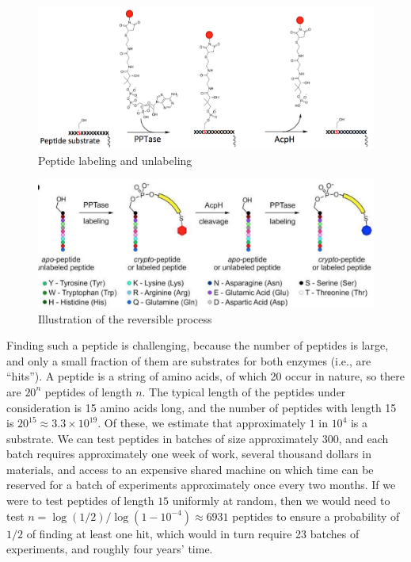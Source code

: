 \documentclass[12pt]{article}
\begin{document}
\begin{figure}[hpt] 
\center
\includegraphics[width=\textwidth]{pic/labeling.png}
\caption{ Peptide labeling and unlabeling}
\label{fig:labeling}
\end{figure}

\begin{figure}[hpt] 
\center
\includegraphics[width=\textwidth]{pic/reversible_peptide.png}
\caption{ Illustration of the reversible process}
\label{fig:reversible}
\end{figure}
Finding such a peptide is challenging, because the number of peptides is large, and only a small fraction of them are substrates for both enzymes (i.e., are ``hits'').  A peptide is a string of amino acids, of which 20 occur in nature, so there are $20^n$ peptides of length $n$.  The typical length of the peptides under consideration is 15 amino acids long, and the number of peptides with length 15 is $20^{15} \approx 3.3 \times 10^{19}$.  Of these, we estimate that approximately $1$ in $10^4$ is a substrate. We can test peptides in batches of size approximately $300$, and each batch requires approximately one week of work, several thousand dollars in materials, and access to an expensive shared machine on which time can be reserved for a batch of experiments approximately once every two months. If we were to test peptides of length $15$ uniformly at random, then we would need to test $n = \log(1/2) / \log(1-10^{-4}) \approx 6931$ peptides to ensure a probability of $1/2$ of finding at least one hit, which would in turn require 23 batches of experiments, and roughly four years' time.
\end{document}
